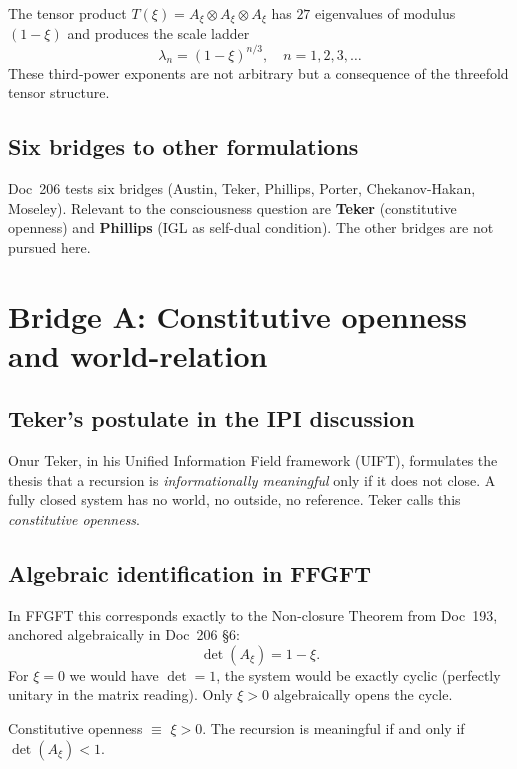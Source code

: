 The tensor product $T(\xi) = A_\xi \otimes A_\xi \otimes A_\xi$ has $27$ eigenvalues of modulus $(1-\xi)$ and produces the scale ladder
\[
\lambda_n = (1-\xi)^{n/3}, \quad n = 1, 2, 3, \dots
\]
These third-power exponents are not arbitrary but a consequence of the threefold tensor structure.

\subsection{Six bridges to other formulations}

Doc~206 tests six bridges (Austin, Teker, Phillips, Porter, Chekanov-Hakan, Moseley). Relevant to the consciousness question are \textbf{Teker} (constitutive openness) and \textbf{Phillips} (IGL as self-dual condition). The other bridges are not pursued here.

\section{Bridge A: Constitutive openness and world-relation}\label{sec:bridgeA}

\subsection{Teker's postulate in the IPI discussion}

Onur Teker, in his Unified Information Field framework (UIFT), formulates the thesis that a recursion is \emph{informationally meaningful} only if it does not close. A fully closed system has no world, no outside, no reference. Teker calls this \emph{constitutive openness}.

\subsection{Algebraic identification in FFGFT}

In FFGFT this corresponds exactly to the Non-closure Theorem from Doc~193, anchored algebraically in Doc~206 \S6:
\begin{equation}
\det(A_\xi) = 1 - \xi.
\end{equation}
For $\xi = 0$ we would have $\det = 1$, the system would be exactly cyclic (perfectly unitary in the matrix reading). Only $\xi > 0$ algebraically opens the cycle.

\begin{insightBox}
Constitutive openness $\equiv$ $\xi > 0$. The recursion is meaningful if and only if $\det(A_\xi) < 1$.
\end{insightBox}

